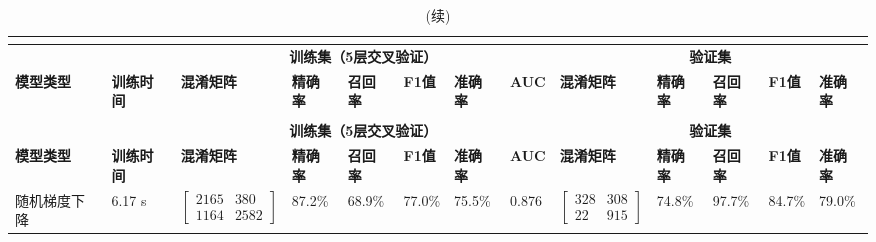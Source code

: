 \begin{landscape}
      \begin{longtable}{m{3cm}<{\centering}m{1.7cm}<{\centering}m{2.3cm}<{\centering}m{1cm}<{\centering}m{1cm}<{\centering}m{1cm}<{\centering}m{1cm}<{\centering}m{1cm}<{\centering}m{2cm}<{\centering}m{1cm}<{\centering}m{1cm}<{\centering}m{1cm}<{\centering}m{1cm}<{\centering}}
            \caption{初筛结果}\\
            \label{tab:model_screen}\\
            \toprule
            &  & \multicolumn{6}{c}{\textbf{训练集（5层交叉验证）}} & \multicolumn{5}{c}{\textbf{验证集}}                                                                                                                                                                                                      \\
            \multirow{-2}{*}{\textbf{模型类型}} & \multirow{-2}{*}{\textbf{训练时间}} & \textbf{混淆矩阵} &  \textbf{精确率} &  \textbf{召回率} &  \textbf{F1值} &  \textbf{准确率} &  \textbf{AUC} &  \textbf{混淆矩阵} &  \textbf{精确率} &  \textbf{召回率} &  \textbf{F1值} &  \textbf{准确率}    \\
            \midrule
            \endfirsthead
            \caption[]{(续)}\\
            \midrule
            &  & \multicolumn{6}{c}{\textbf{训练集（5层交叉验证）}} & \multicolumn{5}{c}{\textbf{验证集}}                                                                                                                                                                                                      \\
            \multirow{-2}{*}{\textbf{模型类型}} & \multirow{-2}{*}{\textbf{训练时间}} & \textbf{混淆矩阵} &  \textbf{精确率} &  \textbf{召回率} &  \textbf{F1值} &  \textbf{准确率} &  \textbf{AUC} &  \textbf{混淆矩阵} &  \textbf{精确率} &  \textbf{召回率} &  \textbf{F1值} &  \textbf{准确率}    \\
            \midrule
            \endhead 
            \midrule
            \endfoot
            \bottomrule
            \endlastfoot
            随机梯度下降      &   6.17 s  &     $\left[ \begin{array}{cc} 2165 & 380 \\ 1164 & 2582 \end{array} \right]$ & 87.2\% & 68.9\% & 77.0\% & 75.5\% & 0.876 &
            $\left[ \begin{array}{cc} 328 & 308 \\ 22 & 915 \end{array} \right]$ & 74.8\% & 97.7\% & 84.7\% & 79.0\% \\

\end{longtable}
\end{landscape}
